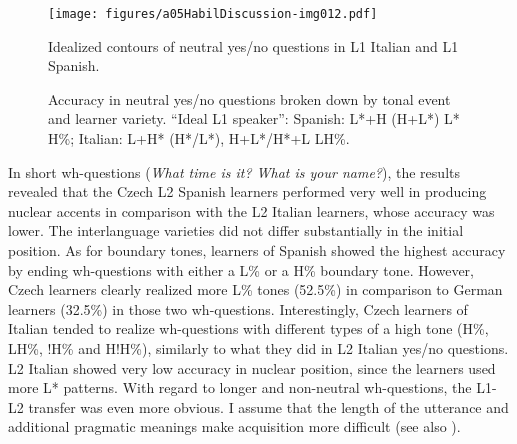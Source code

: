 \begin{figure}

\texttt{[image: figures/a05HabilDiscussion-img012.pdf]}



\caption{Idealized contours of neutral yes/no questions in L1 Italian and L1 Spanish.}
\label{fig:5.8}
\end{figure}

\begin{figure}




\caption{Accuracy in neutral yes/no questions broken down by tonal event and learner variety. ``Ideal L1 speaker'': Spanish: L*+H (H+L*) L* H\%; Italian: L+H* (H*/L*), H+L*/H*+L LH\%.}
\label{fig:5.9}
\end{figure}


In short wh-questions (\textit{What time is it? What is your name?}), the results revealed that the Czech L2 Spanish learners performed very well in producing nuclear accents in comparison with the L2 Italian learners, whose accuracy was lower. The interlanguage varieties did not differ substantially in the initial position. As for boundary tones, learners of Spanish showed the highest accuracy by ending wh-questions with either a L\% or a H\% boundary tone. However, Czech learners clearly realized more L\% tones (52.5\%) in comparison to German learners (32.5\%) in those two wh-questions. Interestingly, Czech learners of Italian tended to realize wh-questions with different types of a high tone (H\%, LH\%, !H\% and H!H\%), similarly to what they did in L2 Italian yes/no questions. L2 Italian showed very low accuracy in nuclear position, since the learners used more L* patterns. With regard to longer and non-neutral wh-questions, the L1-L2 transfer was even more obvious. I assume that the length of the utterance and additional pragmatic meanings make acquisition more difficult (see also \citealt{JunOh2000}).


